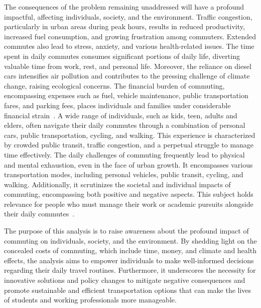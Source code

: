 The consequences of the problem remaining unaddressed will have a profound impactful, affecting individuals, society,
and the environment.
Traffic congestion, particularly in urban areas during peak hours, results in reduced productivity, increased fuel
consumption, and growing frustration among commuters.
Extended commutes also lead to stress, anxiety, and various health-related issues.
The time spent in daily commutes consumes significant portions of daily life, diverting valuable time from work,
rest, and personal life.
Moreover, the reliance on diesel cars intensifies air pollution and contributes to the pressing challenge of
climate change, raising ecological concerns.
The financial burden of commuting, encompassing expenses such as fuel, vehicle maintenance, public transportation fares,
and parking fees, places individuals and families under considerable financial strain~\cite{alma9921355859805762}.
A wide range of individuals, such as kids, teen, adults and elders, often navigate their daily commutes through a
combination of personal cars, public transportation, cycling, and walking.
This experience is characterized by crowded public transit, traffic congestion, and a perpetual struggle to manage time
effectively.
The daily challenges of commuting frequently lead to physical and mental exhaustion, even in the face of urban growth.
It encompasses various transportation modes, including personal vehicles, public transit, cycling, and walking.
Additionally, it scrutinizes the societal and individual impacts of commuting, encompassing both positive and negative
aspects.
This subject holds relevance for people who must manage their work or academic pursuits alongside their daily
commutes~\cite{alma9921355859805762}.

The purpose of this analysis is to raise awareness about the profound impact of commuting on individuals, society, and
the environment.
By shedding light on the concealed costs of commuting, which include time, money, and climate and health effects, the
analysis aims to empower individuals to make well-informed decisions regarding their daily travel routines.
Furthermore, it underscores the necessity for innovative solutions and policy changes to mitigate negative consequences
and promote sustainable and efficient transportation options that can make the lives of students and working
professionals more manageable.

